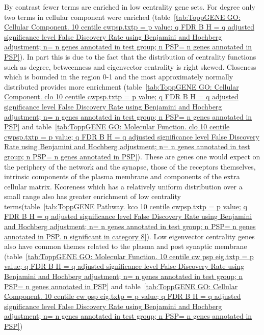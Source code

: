 By contrast fewer terms are enriched in low centrality gene sets. For degree only two terms in cellular component were enriched (table~\ref{tab:ToppGENE GO: Cellular Component. 10 centile cwpsp.txtp = p value; q FDR B H = q adjusted significance level False Discovery Rate using Benjamini and Hochberg adjustment; n= n genes annotated in test group; n PSP= n genes annotated in PSP}). In part this is due to the fact that the distribution of centrality functions such as degree, betweenness and eigenvector centrality is right skewed. Closeness which is bounded in the region 0-1 and the most approximately normally distributed provides more enrichment (table~\ref{tab:ToppGENE GO: Cellular Component. clo 10 centile cwpsp.txtp = p value; q FDR B H = q adjusted significance level False Discovery Rate using Benjamini and Hochberg adjustment; n= n genes annotated in test group; n PSP= n genes annotated in PSP} and table~\ref{tab:ToppGENE GO: Molecular Function. clo 10 centile cwpsp.txtp = p value; q FDR B H = q adjusted significance level False Discovery Rate using Benjamini and Hochberg adjustment; n= n genes annotated in test group; n PSP= n genes annotated in PSP}). These are genes one would expect on the periphery of the network and the synapse, those of the receptors themselves, intrinsic components of the plasma membrane and components of the extra cellular matrix. Kcoreness which has a relatively uniform distribution over a small range also has greater enrichment of low centrality terms(table~\ref{tab:ToppGENE Pathway. kco 10 centile cwpsp.txtp = p value; q FDR B H = q adjusted significance level False Discovery Rate using Benjamini and Hochberg adjustment; n= n genes annotated in test group; n PSP= n genes annotated in PSP. n significant in category 8}). Low eigenvector centrality genes also have common themes related to the plasma and post synaptic membrane (table~\ref{tab:ToppGENE GO: Molecular Function. 10 centile cw psp eig.txtp = p value; q FDR B H = q adjusted significance level False Discovery Rate using Benjamini and Hochberg adjustment; n= n genes annotated in test group; n PSP= n genes annotated in PSP} and table~\ref{tab:ToppGENE GO: Cellular Component. 10 centile cw psp eig.txtp = p value; q FDR B H = q adjusted significance level False Discovery Rate using Benjamini and Hochberg adjustment; n= n genes annotated in test group; n PSP= n genes annotated in PSP})


